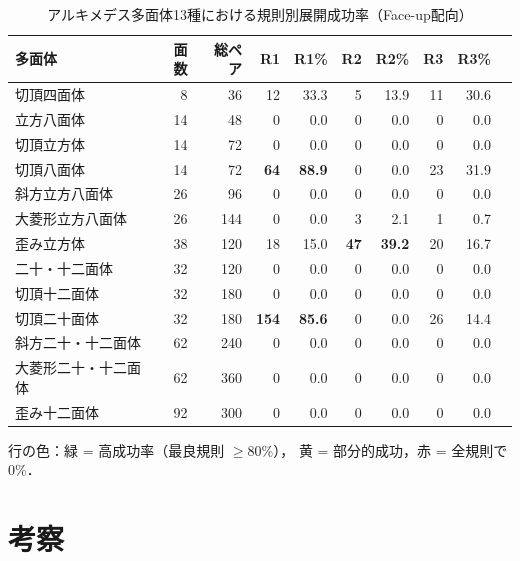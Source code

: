 \documentclass[a4paper,11pt]{article}
\begin{document}
\begin{table}[h]
\centering
\caption{アルキメデス多面体13種における規則別展開成功率（Face-up配向）}
\label{tab:archimedean}
\renewcommand{\arraystretch}{1.25}
\begin{tabular}{lrrrrrrrrr}
\toprule
多面体 & 面数 & 総ペア
  & R1 & R1\% & R2 & R2\% & R3 & R3\% \\
\midrule
\rowcolor{partial}
切頂四面体       &  8 &  36 & 12  & 33.3 &  5 & 13.9 & 11 & 30.6 \\
\rowcolor{zero}
立方八面体       & 14 &  48 &  0  &  0.0 &  0 &  0.0 &  0 &  0.0 \\
\rowcolor{zero}
切頂立方体       & 14 &  72 &  0  &  0.0 &  0 &  0.0 &  0 &  0.0 \\
\rowcolor{best}
切頂八面体       & 14 &  72 & \textbf{64}  & \textbf{88.9} &  0 &  0.0 & 23 & 31.9 \\
\rowcolor{zero}
斜方立方八面体   & 26 &  96 &  0  &  0.0 &  0 &  0.0 &  0 &  0.0 \\
\rowcolor{zero}
大菱形立方八面体 & 26 & 144 &  0  &  0.0 &  3 &  2.1 &  1 &  0.7 \\
\rowcolor{partial}
歪み立方体       & 38 & 120 & 18  & 15.0 & \textbf{47} & \textbf{39.2} & 20 & 16.7 \\
\rowcolor{zero}
二十・十二面体   & 32 & 120 &  0  &  0.0 &  0 &  0.0 &  0 &  0.0 \\
\rowcolor{zero}
切頂十二面体     & 32 & 180 &  0  &  0.0 &  0 &  0.0 &  0 &  0.0 \\
\rowcolor{best}
切頂二十面体     & 32 & 180 & \textbf{154} & \textbf{85.6} &  0 &  0.0 & 26 & 14.4 \\
\rowcolor{zero}
斜方二十・十二面体 & 62 & 240 & 0 & 0.0 &  0 &  0.0 &  0 &  0.0 \\
\rowcolor{zero}
大菱形二十・十二面体 & 62 & 360 & 0 & 0.0 & 0 & 0.0 &  0 &  0.0 \\
\rowcolor{zero}
歪み十二面体     & 92 & 300 &  0  &  0.0 &  0 &  0.0 &  0 &  0.0 \\
\bottomrule
\end{tabular}
\end{table}

\noindent
{\footnotesize 行の色：\colorbox{best}{緑} = 高成功率（最良規則 $\geq 80\%$），
\colorbox{partial}{黄} = 部分的成功，\colorbox{zero}{赤} = 全規則で0\%．}

\section{考察}
\end{document}
